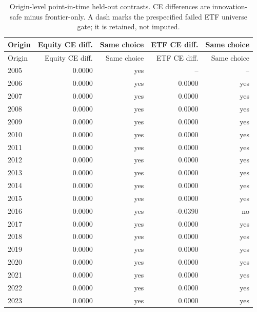 \begin{longtable}{@{}lrrrr@{}}
\caption{Origin-level point-in-time held-out contrasts. CE differences are innovation-safe minus frontier-only. A dash marks the prespecified failed ETF universe gate; it is retained, not imputed.}\label{tab:point-in-time-origin-results}\\
\toprule
Origin & Equity CE diff. & Same choice & ETF CE diff. & Same choice \\
\midrule
\endfirsthead
\toprule
Origin & Equity CE diff. & Same choice & ETF CE diff. & Same choice \\
\midrule
\endhead
2005 & 0.0000 & yes & -- & -- \\
2006 & 0.0000 & yes & 0.0000 & yes \\
2007 & 0.0000 & yes & 0.0000 & yes \\
2008 & 0.0000 & yes & 0.0000 & yes \\
2009 & 0.0000 & yes & 0.0000 & yes \\
2010 & 0.0000 & yes & 0.0000 & yes \\
2011 & 0.0000 & yes & 0.0000 & yes \\
2012 & 0.0000 & yes & 0.0000 & yes \\
2013 & 0.0000 & yes & 0.0000 & yes \\
2014 & 0.0000 & yes & 0.0000 & yes \\
2015 & 0.0000 & yes & 0.0000 & yes \\
2016 & 0.0000 & yes & -0.0390 & no \\
2017 & 0.0000 & yes & 0.0000 & yes \\
2018 & 0.0000 & yes & 0.0000 & yes \\
2019 & 0.0000 & yes & 0.0000 & yes \\
2020 & 0.0000 & yes & 0.0000 & yes \\
2021 & 0.0000 & yes & 0.0000 & yes \\
2022 & 0.0000 & yes & 0.0000 & yes \\
2023 & 0.0000 & yes & 0.0000 & yes \\
\bottomrule
\end{longtable}
